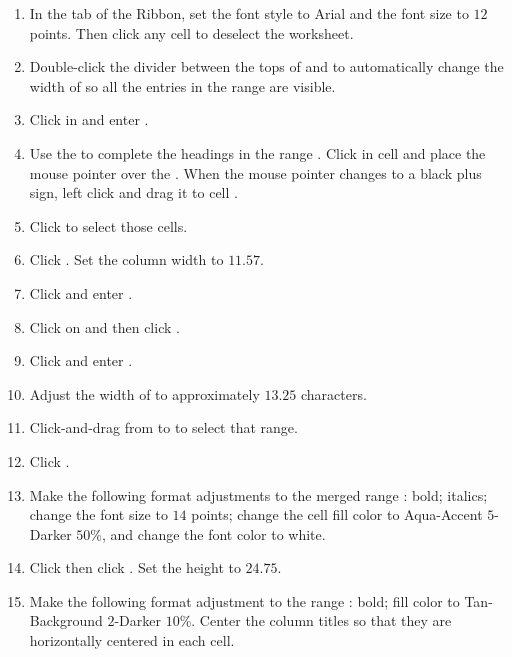 \begin{enumerate}[resume]
	\item In the  tab of the Ribbon, set the font style to Arial and the font size to $ 12 $ points. Then click any cell to deselect the worksheet.
	\item Double-click the divider between the tops of  and  to automatically change the width of  so all the entries in the range  are visible. 
	\item Click in  and enter .
	\item Use the  to complete the headings in the range . Click in cell  and place the mouse pointer over the . When the mouse pointer changes to a black plus sign, left click and drag it to cell .
	\item Click  to select those cells. 
	\item Click . Set the column width to $ 11.57 $.
	\item Click  and enter .
	\item Click on  and then click .
	\item Click  and enter .
	\item Adjust the width of  to approximately $ 13.25 $ characters.
	\item Click-and-drag from  to  to select that range. 
	\item Click .
	\item Make the following format adjustments to the merged range : bold; italics; change the font size to $ 14 $ points; change the cell fill color to Aqua-Accent $ 5 $-Darker $ 50 $\%, and change the font color to white.
	\item Click  then click . Set the height to $ 24.75 $.
	\item Make the following format adjustment to the range : bold; fill color to Tan-Background $ 2 $-Darker $ 10 $\%. Center the column titles so that they are horizontally centered in each cell.

\end{enumerate}
